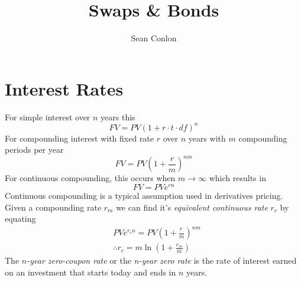 \documentclass{article}
\title{Swaps \& Bonds}
\author{Sean Conlon}
\begin{document}
\maketitle

\newpage
\section*{Interest Rates}
For simple interest over $n$ years this 
$$FV = PV(1+r\cdot t\cdot df)^n$$
For compounding interest with fixed rate $r$ over $n$ years with $m$ compounding periods per year
$$FV = PV\left(1+\frac{r}{m}\right)^{nm}$$
For continuous compounding, this occurs when $m\rightarrow\infty$ which results in 
$$FV = PVe^{rn}$$
Continuous compounding is a typical assumption used in derivatives pricing. Given a compounding rate $r_m$ we can find it's \textit{equivalent continuous rate} $r_c$ by equating 
\begin{align*}
    & PVe^{r_cn} = PV\left(1+\frac{r_,}{m}\right)^{nm} \\
    & \therefore r_c = m \ln\left(1+\frac{r_m}{m} \right)
\end{align*}
The $n$\textit{-year zero-coupon rate} or the \textit{n-year zero rate} is the rate of interest earned on an investment that starts today and ends in $n$ years.
\end{document}
